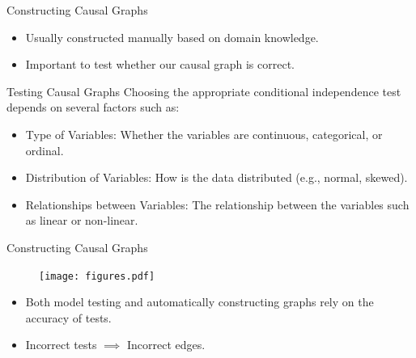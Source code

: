 \documentclass[aspectratio=169]{beamer}
\begin{document}
\begin{frame}{Constructing Causal Graphs}
	
	\vspace{2em}
	
	\begin{itemize}
		\item Usually constructed manually based on domain knowledge.
		\item Important to test whether our causal graph is correct.
	\end{itemize}

	\vfill
	
\end{frame}

\begin{frame}{Testing Causal Graphs}
	Choosing the appropriate conditional independence test depends on several factors
	such as:
	\begin{itemize}
		\item Type of Variables: Whether the variables are continuous, categorical, or ordinal.
		\item Distribution of Variables: How is the data distributed (e.g., normal, skewed).
		\item Relationships between Variables: The relationship between the variables such as linear or non-linear.
	\end{itemize}

	\vspace{2em}
		
\end{frame}

\begin{frame}{Constructing Causal Graphs}
	\begin{figure}
		\center
		\texttt{[image: figures.pdf]}
	\end{figure}

	\begin{itemize}
		\item Both model testing and automatically constructing graphs rely on the accuracy of tests.
		\item Incorrect tests $ \implies $ Incorrect edges.
	\end{itemize}

	\vspace{0.5em}
	
\end{frame}
\end{document}
